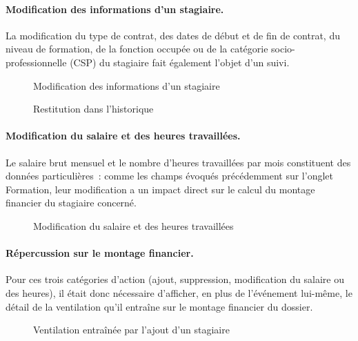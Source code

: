 \paragraph{Modification des informations d'un stagiaire.}
La modification du type de contrat, des dates de début et de fin de
contrat, du niveau de formation, de la fonction occupée ou de la
catégorie socio-professionnelle (CSP) du stagiaire fait également l'objet
d'un suivi.

\begin{figure}[H]
  \centering
  \caption{Modification des informations d'un stagiaire}
  \label{fig:modif-stagiaire}
\end{figure}

\begin{figure}[H]
  \centering
  \caption{Restitution dans l'historique}
  \label{fig:modif-stagiaire-hist}
\end{figure}

\paragraph{Modification du salaire et des heures travaillées.}
Le salaire brut mensuel et le nombre d'heures travaillées par mois
constituent des données particulières~: comme les champs évoqués
précédemment sur l'onglet Formation, leur modification a un impact direct
sur le calcul du montage financier du stagiaire concerné.

\begin{figure}[H]
  \centering
  \caption{Modification du salaire et des heures travaillées}
  \label{fig:modif-salaire-heures}
\end{figure}

\paragraph{Répercussion sur le montage financier.}
Pour ces trois catégories d'action (ajout, suppression, modification du
salaire ou des heures), il était donc nécessaire d'afficher, en plus de
l'événement lui-même, le détail de la ventilation qu'il entraîne sur le
montage financier du dossier.

\begin{figure}[H]
  \centering
  \caption{Ventilation entraînée par l'ajout d'un stagiaire}
  \label{fig:vent-ajout-stagiaire}
\end{figure}

